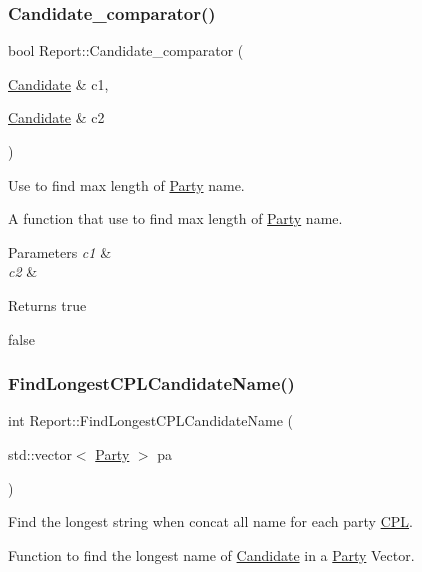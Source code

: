 \subsubsection{\texorpdfstring{Candidate\+\_\+comparator()}{Candidate\_comparator()}}
{\footnotesize\ttfamily bool Report\+::\+Candidate\+\_\+comparator (\begin{DoxyParamCaption}\item[{\hyperlink{classCandidate}{Candidate} \&}]{c1,  }\item[{\hyperlink{classCandidate}{Candidate} \&}]{c2 }\end{DoxyParamCaption})\hspace{0.3cm}{\ttfamily [static]}}



Use to find max length of \hyperlink{classParty}{Party} name. 

A function that use to find max length of \hyperlink{classParty}{Party} name.


\begin{DoxyParams}{Parameters}
{\em c1} & \\
\hline
{\em c2} & \\
\hline
\end{DoxyParams}
\begin{DoxyReturn}{Returns}
true 

false 
\end{DoxyReturn}
\mbox{\label{classReport_a077538dbc2a1953af4d9cb39502d8749}} 
\subsubsection{\texorpdfstring{Find\+Longest\+C\+P\+L\+Candidate\+Name()}{FindLongestCPLCandidateName()}}
{\footnotesize\ttfamily int Report\+::\+Find\+Longest\+C\+P\+L\+Candidate\+Name (\begin{DoxyParamCaption}\item[{std\+::vector$<$ \hyperlink{classParty}{Party} $>$}]{pa }\end{DoxyParamCaption})}



Find the longest string when concat all name for each party \hyperlink{classCPL}{C\+PL}. 

Function to find the longest name of \hyperlink{classCandidate}{Candidate} in a \hyperlink{classParty}{Party} Vector.


